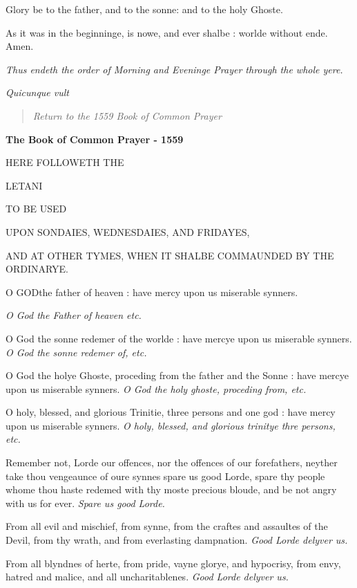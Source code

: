 Glory be to the father, and to the sonne: and to the
holy Ghoste. 

As it was in the beginninge, is nowe, and ever shalbe
: worlde without ende. Amen.

\emph{Thus
endeth the order of Morning and Eveninge Prayer through the whole yere.}

\emph{Quicunque vult}

\begin{quote}

\emph{Return to the 1559
Book of Common Prayer}

\end{quote}


\textbf{The Book of Common Prayer - 1559}

HERE
FOLLOWETH THE

LETANI

TO BE
USED \textbf{}

UPON SONDAIES,
WEDNESDAIES, AND FRIDAYES,

AND AT
OTHER TYMES, WHEN IT SHALBE COMMAUNDED BY THE ORDINARYE.

O
GOD\textbf{}the father of heaven : have mercy upon us miserable synners.

\emph{O
God the Father of heaven etc.}

O God the sonne redemer of the worlde : have mercye upon us miserable
synners.
\emph{O
God the sonne redemer of, etc.}

O God the holye Ghoste, proceding from the father and the Sonne : have
mercye upon us miserable synners.
\emph{O
God the holy ghoste, proceding from, etc.}

O holy, blessed, and glorious Trinitie, three persons and one god : have
mercy upon us miserable synners.
\emph{O
holy, blessed, and glorious trinitye thre persons, etc.}

Remember not, Lorde our offences, nor the offences of our forefathers,
neyther take thou vengeaunce of oure synnes spare us good Lorde, spare
thy people whome thou haste redemed with thy moste precious bloude, and
be not angry with us for ever.
\emph{Spare
us good Lorde.}

From all evil and mischief, from synne, from the craftes and assaultes
of the Devil, from thy wrath, and from everlasting dampnation.
\emph{Good
Lorde delyver us.}

From all blyndnes of herte, from pride, vayne glorye, and hypocrisy, from
envy, hatred and malice, and all uncharitablenes.
\emph{Good
Lorde delyver us.}


